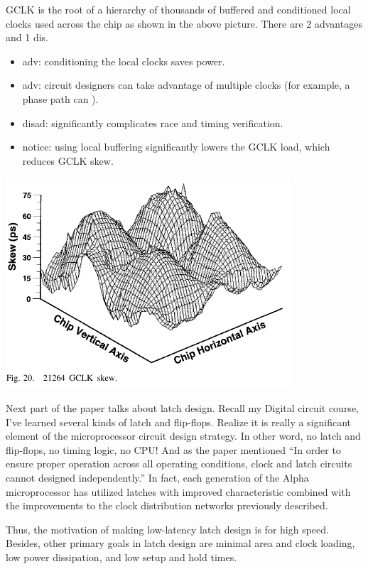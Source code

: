 \documentclass[11pt]{article}
\newcommand{\note}[1]{\scriptsize{#1}\normalsize}
\begin{document}
GCLK is the root of a hierarchy of thousands of buffered and conditioned local clocks used across the chip as shown in the above picture. There are 2 advantages and 1 dis.
\begin{itemize}
	\item adv: conditioning the local clocks saves power.
	\item adv: circuit designers can take advantage of multiple clocks (\note{for example, a phase path can }).
	\item disad: significantly complicates race and timing verification.
	\item notice: using local buffering significantly lowers the GCLK load, which reduces GCLK skew.
\end{itemize}
\begin{center}
	\includegraphics[scale=0.5]{21264.png}
\end{center}
Next part of the paper talks about latch design. Recall my Digital circuit course, I've learned several kinds of latch and flip-flops. Realize it is really a significant element of the microprocessor circuit design strategy. In other word, no latch and flip-flops, no timing logic, no CPU! And as the paper mentioned ``In order to ensure proper operation across all operating conditions, clock and latch circuits cannot designed independently.'' In fact, each generation of the Alpha microprocessor has utilized latches with improved characteristic combined with the improvements to the clock distribution networks previously described.

Thus, the motivation of making low-latency latch design is for high speed. Besides, other primary goals in latch design are minimal area and clock loading, low power dissipation, and low setup and hold times.
\end{document}
